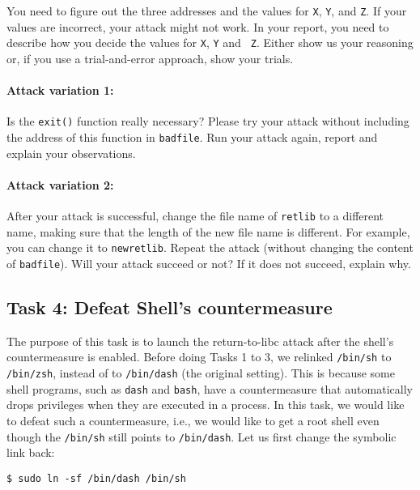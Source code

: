 You need to figure out the three addresses and the values for 
\texttt{X}, \texttt{Y}, and \texttt{Z}. 
If your values are incorrect,
your attack might not work. In your report, you need to
describe how you decide the values for {\tt X}, {\tt Y} and {\tt
Z}. Either show us your reasoning or, if you use a trial-and-error approach,
show your trials.



\paragraph{Attack variation 1:}
Is the \texttt{exit()} function really necessary? Please try 
your attack without including the address of this function in
\texttt{badfile}. Run your attack again, report and explain your
observations.  



\paragraph{Attack variation 2:} 
After your attack is successful, change the file name of \texttt{retlib}
to a different name, making sure that the length of the new 
file name is different. For example, you can change it to \texttt{newretlib}. 
Repeat the attack (without changing the content of {\tt badfile}). 
Will your attack succeed or not?  If it does not succeed, explain why.


\subsection{Task 4: Defeat Shell's countermeasure}

The purpose of this task is to launch the return-to-libc attack after 
the shell's countermeasure is enabled. 
Before doing Tasks 1 to 3, we relinked \texttt{/bin/sh} to \texttt{/bin/zsh},
instead of to \texttt{/bin/dash} (the original setting). This is because some shell programs, such 
as \texttt{dash} and \texttt{bash}, have a countermeasure that automatically 
drops privileges when they are executed in a \setuid process. In this task, we 
would like to defeat such a countermeasure, i.e., we would like to get a root shell even though
the \texttt{/bin/sh} still points to \texttt{/bin/dash}.   
Let us first change the symbolic link back:

\begin{lstlisting}
$ sudo ln -sf /bin/dash /bin/sh
\end{lstlisting}

